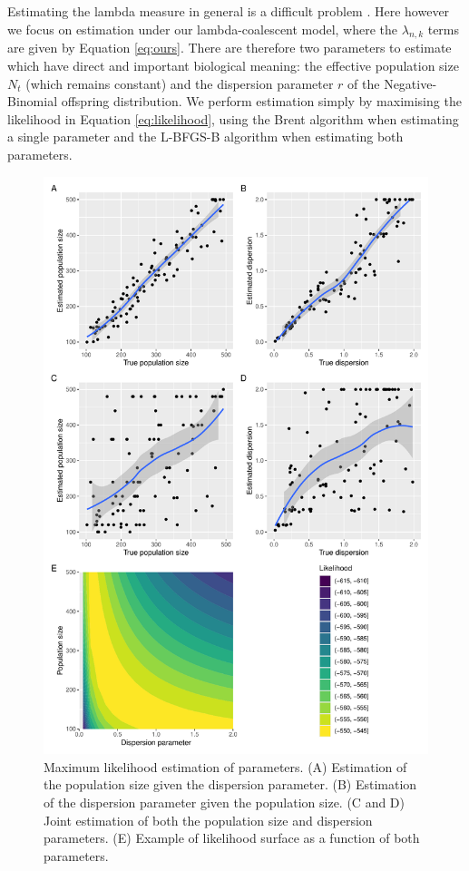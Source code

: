 \documentclass{article}
\renewcommand{\eqref}[1]{\ref{#1}}
\begin{document}
Estimating the lambda measure in general is a difficult problem
\citep{Koskela2018a,miropinaEstimatingLambdaMeasure2023}.
Here however we focus on estimation under our lambda-coalescent model,
where the $\lambda_{n,k}$ terms are given by Equation \eqref{eq:ours}.
There are therefore two parameters to estimate which have direct and important 
biological meaning:
the effective population size $N_t$ (which remains constant) and the dispersion
parameter $r$ of the Negative-Binomial offspring distribution. 
We perform estimation simply by maximising the likelihood in Equation \eqref{eq:likelihood},
using the Brent algorithm \citep{brent1971algorithm} when estimating a single parameter
and the L-BFGS-B algorithm when \citep{byrd1995limited} estimating both parameters.

\begin{figure}[!p]
\begin{center}
\includegraphics[width=14cm]{../run/figureEstim.pdf}
\end{center}
\caption{Maximum likelihood estimation of parameters. (A) Estimation of the population
size given the dispersion parameter. (B) Estimation of the dispersion parameter
given the population size. (C and D) Joint estimation of both the population
size and dispersion parameters. (E) Example of likelihood surface as a function
of both parameters.
\label{fig:estim}}
\end{figure}
\end{document}
